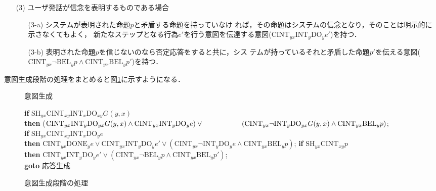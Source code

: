\begin{enumerate}
\begin{enumerate}
\begin{enumerate}
\end{enumerate}

\end{enumerate}

\item[(3)] ユーザ発話が信念を表明するものである場合

\begin{enumerate}

\item[(3-a)] システムが表明された命題$p$と矛盾する命題を持っていなけ
れば，その命題はシステムの信念となり，そのことは明示的に示さなくてもよく，
新たなステップとなる行為$e'$を行う意図を伝達する意図($\mbox{CINT}_{yx}
\mbox{INT}_y \mbox{DO}_y e'$)を持つ．

\item[(3-b)] 表明された命題$p$を信じないのなら否定応答をすると共に，シス
テムが持っているそれと矛盾した命題$p'$を伝える意図($\mbox{CINT}_{yx}
\lnot \mbox{BEL}_y p \land \mbox{CINT}_{yx} \mbox{BEL}_y p'$)を持つ．
\end{enumerate}
\end{enumerate}

意図生成段階の処理をまとめると図\ref{step4}に示すようになる．

\begin{figure}[htbp]
\noindent
\hspace*{1cm}
{\dg 意図生成}

\noindent
\hspace*{1cm}
{\bf if} $\mbox{SH}_{yx}\mbox{CINT}_{xy} \mbox{INT}_x
 \mbox{DO}_{xy} G(y,x)$\\
\hspace*{1cm}
{\bf then}  ($\mbox{CINT}_{yx} \mbox{INT}_y 
\mbox{DO}_{yx} G(y,x) \land \mbox{CINT}_{yx} \mbox{INT}_y 
\mbox{DO}_y e) \lor \\
\hspace*{1cm}
\hspace*{9mm}(\mbox{CINT}_{yx} \lnot 
\mbox{INT}_y \mbox{DO}_{yx} G(y,x) \land \mbox{CINT}_{yx} 
\mbox{BEL}_y p)$;\\
\hspace*{1cm}
{\bf if}  $\mbox{SH}_{yx}\mbox{CINT}_{xy} \mbox{INT}_x
 \mbox{DO}_y e$\\
\hspace*{1cm}
{\bf then}  $\mbox{CINT}_{yx} \mbox{DONE}_y e 
\lor \mbox{CINT}_{yx} \mbox{INT}_y \mbox{DO}_y e'
\lor (\mbox{CINT}_{yx} \lnot \mbox{INT}_y \mbox{DO}_y e
\land \mbox{CINT}_{yx} \mbox{BEL}_y p)$;
\hspace*{1cm}
{\bf if}  $\mbox{SH}_{yx}\mbox{CINT}_{xy} p$\\
\hspace*{1cm}
{\bf then}  $\mbox{CINT}_{yx} 
\mbox{INT}_y \mbox{DO}_y e'
\lor (\mbox{CINT}_{yx} \lnot \mbox{BEL}_y p
\land \mbox{CINT}_{yx} \mbox{BEL}_y p')$;\\
\hspace*{1cm}
{\bf goto} 応答生成

\caption{意図生成段階の処理}
\label{step4}
\end{figure}


